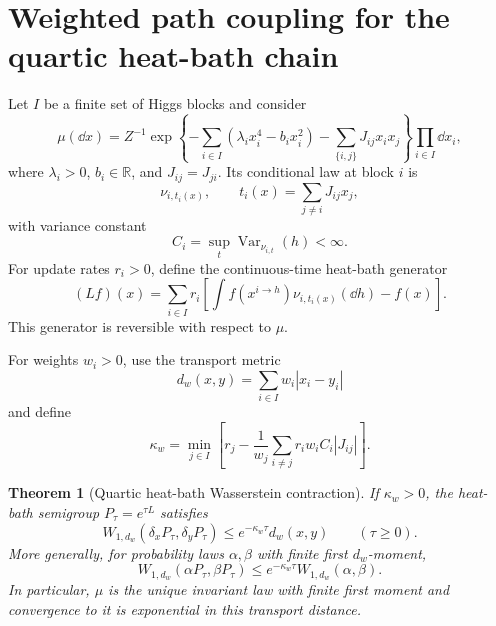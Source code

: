 \documentclass[11pt]{article}
\newtheorem{theorem}{Theorem}[section]
\theoremstyle{remark}
\begin{document}
\section{Weighted path coupling for the quartic heat-bath chain}
\label{sec:v15v1-path-coupling}

Let \(I\) be a finite set of Higgs blocks and consider
\[
 \mu(\dd x)=Z^{-1}\exp\left\{
 -\sum_{i\in I}(\lambda_ix_i^4-b_ix_i^2)
 -\sum_{\{i,j\}}J_{ij}x_ix_j
 \right\}\prod_{i\in I}\dd x_i,                              \tag{1.12}
\]
where \(\lambda_i>0\), \(b_i\in\mathbb R\), and
\(J_{ij}=J_{ji}\).  Its conditional law at block \(i\) is
\[
 \nu_{i,t_i(x)},\qquad
 t_i(x)=\sum_{j\ne i}J_{ij}x_j,                              \tag{1.13}
\]
with variance constant
\[
 C_i=\sup_t\operatorname{Var}_{\nu_{i,t}}(h)<\infty.
\]
For update rates \(r_i>0\), define the continuous-time heat-bath
generator
\[
 (Lf)(x)=\sum_{i\in I}r_i
 \left[
 \int f(x^{i\to h})\nu_{i,t_i(x)}(\dd h)-f(x)
 \right].                                                    \tag{1.14}
\]
This generator is reversible with respect to \(\mu\).

For weights \(w_i>0\), use the transport metric
\[
 d_w(x,y)=\sum_{i\in I}w_i|x_i-y_i|                           \tag{1.15}
\]
and define
\[
 \kappa_w
 =\min_{j\in I}
 \left[
 r_j-\frac1{w_j}
 \sum_{i\ne j}r_iw_iC_i|J_{ij}|
 \right].                                                    \tag{1.16}
\]

\begin{theorem}[Quartic heat-bath Wasserstein contraction]
\label{thm:v15v1-path-contraction}
If \(\kappa_w>0\), the heat-bath semigroup \(P_\tau=e^{\tau L}\)
satisfies
\[
 \boxed{
 W_{1,d_w}(\delta_xP_\tau,\delta_yP_\tau)
 \le e^{-\kappa_w\tau}d_w(x,y)}
 \qquad(\tau\ge0).                                           \tag{1.17}
\]
More generally, for probability laws \(\alpha,\beta\) with finite
first \(d_w\)-moment,
\[
 W_{1,d_w}(\alpha P_\tau,\beta P_\tau)
 \le e^{-\kappa_w\tau}W_{1,d_w}(\alpha,\beta).                \tag{1.18}
\]
In particular, \(\mu\) is the unique invariant law with finite
first moment and convergence to it is exponential in this
transport distance.
\end{theorem}
\end{document}
